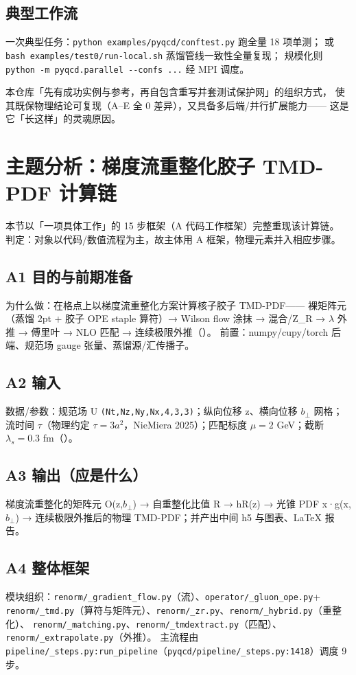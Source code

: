 \documentclass[UTF8]{ctexart}
\begin{document}
\subsection{典型工作流}
一次典型任务：\nolinkurl{python examples/pyqcd/conftest.py} 跑全量 18 项单测；
或 \nolinkurl{bash examples/test0/run-local.sh} 蒸馏管线一致性全量复现；
规模化则 \nolinkurl{python -m pyqcd.parallel --confs ...} 经 MPI 调度。
\begin{ideabox}
本仓库「先有成功实例与参考，再自包含重写并套测试保护网」的组织方式，
使其既保物理结论可复现（A–E 全 0 差异），又具备多后端/并行扩展能力——
这是它「长这样」的灵魂原因。
\end{ideabox}

\section{主题分析：梯度流重整化胶子 TMD-PDF 计算链}
本节以「一项具体工作」的 15 步框架（A 代码工作框架）完整重现该计算链。
判定：对象以代码/数值流程为主，故主体用 A 框架，物理元素并入相应步骤。

\subsection{A1 目的与前期准备}
为什么做：在格点上以梯度流重整化方案计算核子胶子 TMD-PDF——
裸矩阵元（蒸馏 2pt + 胶子 OPE staple 算符）→ Wilson flow 涂抹 → 混合/Z\_R →
$\lambda$ 外推 → 傅里叶 → NLO 匹配 → 连续极限外推（\textcolor{evidence}{\texttt{}}）。
前置：numpy/cupy/torch 后端、规范场 gauge 张量、蒸馏源/汇传播子。

\subsection{A2 输入}
数据/参数：规范场 U \texttt{(Nt,Nz,Ny,Nx,4,3,3)}；纵向位移 z、横向位移 $b_\perp$ 网格；
流时间 $\tau$（物理约定 $\tau=3a^2$，NieMiera 2025）；匹配标度 $\mu=2$ GeV；截断 $\lambda_s=0.3$ fm（\textcolor{evidence}{\texttt{}}）。

\subsection{A3 输出（应是什么）}
梯度流重整化的矩阵元 O(z,$b_\perp$) → 自重整化比值 R → hR(z) → 光锥 PDF x·g(x,$b_\perp$) →
连续极限外推后的物理 TMD-PDF；并产出中间 h5 与图表、LaTeX 报告。

\subsection{A4 整体框架}
模块组织：\nolinkurl{renorm/\_gradient\_flow.py}（流）、\nolinkurl{operator/\_gluon\_ope.py}+
\nolinkurl{renorm/\_tmd.py}（算符与矩阵元）、\nolinkurl{renorm/\_zr.py}、\nolinkurl{renorm/\_hybrid.py}（重整化）、
\nolinkurl{renorm/\_matching.py}、\nolinkurl{renorm/\_tmdextract.py}（匹配）、\nolinkurl{renorm/\_extrapolate.py}（外推）。
主流程由 \nolinkurl{pipeline/\_steps.py:run\_pipeline}（\textcolor{evidence}{\nolinkurl{pyqcd/pipeline/_steps.py:1418}}）调度 9 步。
\end{document}
